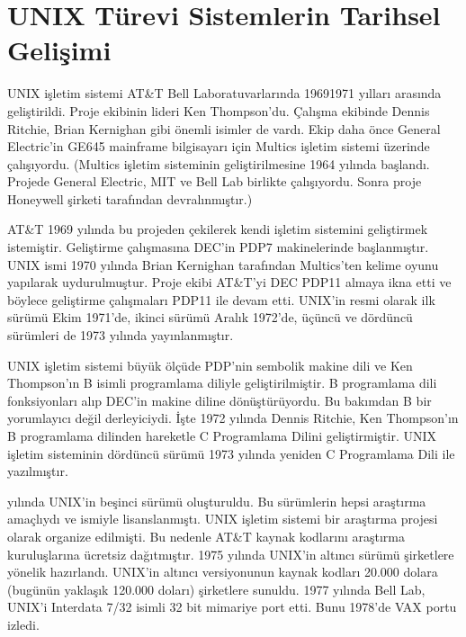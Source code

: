 \documentclass[a4paper,10pt,turkish]{sphinxmanual}
\begin{document}
\section{UNIX Türevi Sistemlerin Tarihsel Gelişimi}
\label{\detokenize{introduction:unix-turevi-sistemlerin-tarihsel-gelisimi}}\label{\detokenize{introduction:ders03}}
\sphinxAtStartPar
UNIX işletim sistemi AT\&T Bell Laboratuvarlarında 1969\sphinxhyphen{}1971 yılları arasında geliştirildi.
Proje ekibinin lideri Ken Thompson’du. Çalışma ekibinde Dennis Ritchie, Brian Kernighan gibi
önemli isimler de vardı. Ekip daha önce General Electric’in GE\sphinxhyphen{}645 mainframe bilgisayarı
için Multics işletim sistemi üzerinde çalışıyordu. (Multics işletim sisteminin
geliştirilmesine 1964 yılında başlandı. Projede General Electric, MIT ve Bell Lab birlikte
çalışıyordu. Sonra proje Honeywell şirketi tarafından devralınmıştır.)

\sphinxAtStartPar
AT\&T 1969 yılında bu projeden çekilerek kendi işletim sistemini geliştirmek istemiştir.
Geliştirme çalışmasına DEC’in PDP\sphinxhyphen{}7 makinelerinde başlanmıştır. UNIX ismi 1970 yılında
Brian Kernighan tarafından Multics’ten kelime oyunu yapılarak uydurulmuştur. Proje ekibi
AT\&T’yi DEC PDP\sphinxhyphen{}11 almaya ikna etti ve böylece geliştirme çalışmaları PDP\sphinxhyphen{}11 ile devam
etti. UNIX’in resmi olarak ilk sürümü Ekim 1971’de, ikinci sürümü Aralık 1972’de, üçüncü
ve dördüncü sürümleri de 1973 yılında yayınlanmıştır.

\sphinxAtStartPar
UNIX işletim sistemi büyük ölçüde PDP’nin sembolik makine dili ve Ken Thompson’ın B isimli
programlama diliyle geliştirilmiştir. B programlama dili fonksiyonları alıp DEC’in makine
diline dönüştürüyordu. Bu bakımdan B bir yorumlayıcı değil derleyiciydi. İşte 1972 yılında
Dennis Ritchie, Ken Thompson’ın B programlama dilinden hareketle C Programlama Dilini
geliştirmiştir. UNIX işletim sisteminin dördüncü sürümü 1973 yılında yeniden C Programlama
Dili ile yazılmıştır.

 yılında UNIX’in beşinci sürümü oluşturuldu. Bu sürümlerin hepsi araştırma amaçlıydı
ve  ismiyle lisanslanmıştı. UNIX işletim sistemi bir araştırma projesi
olarak organize edilmişti. Bu nedenle AT\&T kaynak kodlarını araştırma kuruluşlarına ücretsiz
dağıtmıştır. 1975 yılında UNIX’in altıncı sürümü şirketlere yönelik hazırlandı. UNIX’in
altıncı versiyonunun kaynak kodları 20.000 dolara (bugünün yaklaşık 120.000 doları) şirketlere
sunuldu. 1977 yılında Bell Lab, UNIX’i Interdata 7/32 isimli 32 bit mimariye port etti.
Bunu 1978’de VAX portu izledi.
\end{document}
